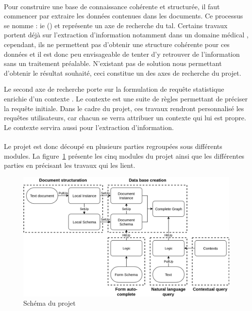 \paragraph{}
Pour construire une base de connaissance cohérente et structurée, il faut commencer par extraire les données contenues dans les documents.
Ce processus se nomme : \gls{ie} (\cite{grishman_information_1997,cowie_information_2000}) et représente un axe de recherche du \gls{tal}.
Certains travaux portent déjà sur l'extraction d'information notamment dans un domaine médical \cite{polepalli_ramesh_automatically_2014}, cependant, ils ne permettent pas d'obtenir une structure cohérente pour ces données et il est donc peu envisageable de tenter d'y retrouver de l'information sans un traitement préalable.
N'existant pas de solution nous permettant d'obtenir le résultat souhaité, ceci constitue un des axes de recherche du projet.

Le second axe de recherche porte sur la formulation de requête statistique enrichie d'un contexte \cite{chabin_context-driven_2018}.
Le contexte est une suite de règles permettant de préciser la requête initiale.
Dans le cadre du projet, ces travaux rendront personnalisé les requêtes utilisateurs, car chacun se verra attribuer un contexte qui lui est propre.
Le contexte servira aussi pour l'extraction d'information.

\paragraph{}
Le projet est donc découpé en plusieurs parties regroupées sous différents modules.
La figure~\ref{fig:sch_projet} présente les cinq modules du projet ainsi que les différentes parties en précisant les travaux qui les lient.

\begin{figure}[htb]
    \centering
    \includegraphics[width=\linewidth]{these/images/global_project.png}
    \caption{Schéma du projet}
    \label{fig:sch_projet}
\end{figure}

